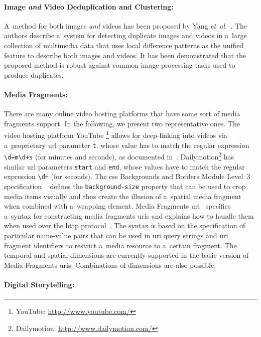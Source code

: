 \paragraph{Image \emph{and} Video Deduplication and Clustering:}

A~method for both images \emph{and} videos
has been proposed by Yang \emph{et~al.}\ \cite{yang2009nearduplicate}.
The authors describe a~system for detecting duplicate images and videos
in a~large collection of multimedia data that uses local difference patterns
as the unified feature to describe both images and videos.
It has been demonstrated that the proposed method is robust against
common image-processing tasks used to produce duplicates.

\paragraph{Media Fragments:}

There are many online video hosting platforms
that have some sort of media fragments support.
In the following, we present two representative ones.
The video hosting platform YouTube%
\footnote{YouTube: \url{http://www.youtube.com/}}
allows for deep-linking into videos
via a~proprietary {\sc url} parameter \texttt{t},
whose value has to match the regular expression
\texttt{\textbackslash d+m\textbackslash d+s} (for minutes and seconds),
as documented in~\cite{youtube2008link}.
Dailymotion\footnote{Dailymotion: \url{http://www.dailymotion.com/}}
has similar {\sc url} parameters \texttt{start} and \texttt{end},
whose values have to match the regular expression
\texttt{\textbackslash d+} (for seconds).
The {\sc css} Backgrounds and Borders Module Level~3 specification%
~\cite{bos2012css3} defines the \texttt{background-size} property
that can be used to crop media items visually
and thus create the illusion of a~spatial media fragment
when combined with a~wrapping element.
Media Fragments {\sc uri}~\cite{troncy2012mediafragments}
specifies a~syntax for constructing media fragments {\sc uri}s
and explains how to handle them
when used over the {\sc http} protocol~\cite{fielding1999http}.
The syntax is based on the specification of particular name-value pairs
that can be used in {\sc uri} query strings and {\sc uri} fragment identifiers
to restrict a~media resource to a~certain fragment.
The temporal and spatial dimensions are currently supported
in the basic version of Media Fragments {\sc uri}s.
Combinations of dimensions are also possible.

\paragraph{Digital Storytelling:}

